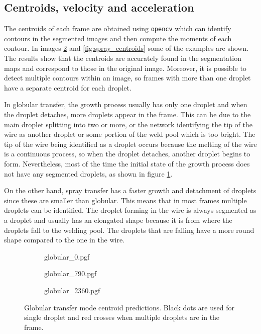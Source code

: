 \subsection{Centroids, velocity and acceleration}

The centroids of each frame are obtained using \texttt{opencv} which can identify contours in the segmented images and then compute the moments of each contour. In images \ref{fig:globular_centroids} and \ref{fig:spray_centroids} some of the examples are shown. The results show that the centroids are accurately found in the segmentation maps and correspond to those in the original image. Moreover, it is possible to detect multiple contours within an image, so frames with more than one droplet have a separate centroid for each droplet.

In globular transfer, the growth process usually has only one droplet and when the droplet detaches, more droplets appear in the frame. This can be due to the main droplet splitting into two or more, or the network identifying the tip of the wire as another droplet or some portion of the weld pool which is too bright. The tip of the wire being identified as a droplet occurs because the melting of the wire is a continuous process, so when the droplet detaches, another droplet begins to form. Nevertheless, most of the time the initial state of the growth process does not have any segmented droplets, as shown in figure \ref{fig:globular_centroids_3}.

On the other hand, spray transfer has a faster growth and detachment of droplets since these are smaller than globular. This means that in most frames multiple droplets can be identified. The droplet forming in the wire is always segmented as a droplet and usually has an elongated shape because it is from where the droplets fall to the welding pool. The droplets that are falling have a more round shape compared to the one in the wire.

\begin{figure}
\centering
  \begin{subfigure}[b]{0.45\textwidth}
    {globular_0.pgf}
    \caption{}

  \end{subfigure}
\hfill
  \begin{subfigure}[b]{0.45\textwidth}
    {globular_790.pgf}
    \caption{}
  \end{subfigure}
  \begin{subfigure}[b]{0.45\textwidth}
    {globular_2360.pgf}
    \caption{}
    \label{fig:globular_centroids_3}
  \end{subfigure}
    \caption[Globular transfer mode centroid predictions]{Globular transfer mode centroid predictions. Black dots are used for single droplet and red crosses when multiple droplets are in the frame.}
    \label{fig:globular_centroids}
\end{figure}

